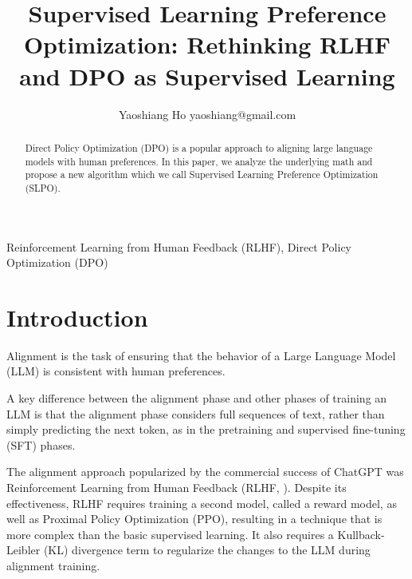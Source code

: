 \documentclass[twoside,11pt]{article}
\begin{document}
\title{Supervised Learning Preference Optimization: Rethinking RLHF and DPO as Supervised Learning}

\author{\name Yaoshiang Ho \email yaoshiang@gmail.com \\
      }

\editor{}

\maketitle 

\begin{abstract}%
Direct Policy Optimization (DPO) is a popular approach to aligning 
large language models with human preferences. 
In this paper, we analyze the underlying math and 
propose a new algorithm
which we call Supervised Learning Preference Optimization (SLPO). 
 
\end{abstract}

\begin{keywords}
  Reinforcement Learning from Human Feedback (RLHF), Direct Policy Optimization (DPO)
\end{keywords}

\section{Introduction}

Alignment is the task of ensuring that the behavior of a
Large Language Model (LLM) is consistent 
with human preferences. 

A key difference between the alignment phase and
other phases of training an LLM is that the alignment phase considers
full sequences of text, rather than simply predicting the next token, as
in the pretraining and supervised fine-tuning (SFT) phases. 

The alignment approach popularized by the commercial success of ChatGPT was 
Reinforcement Learning from Human Feedback (RLHF, \cite{ouyang2022training}). 
Despite its effectiveness, RLHF requires training a second model, called
a reward model, as well as Proximal Policy Optimization (PPO), resulting in a 
technique that is more complex than the basic supervised learning. It also
requires a Kullback-Leibler (KL) divergence term to regularize the
changes to the LLM during alignment training.
\end{document}
